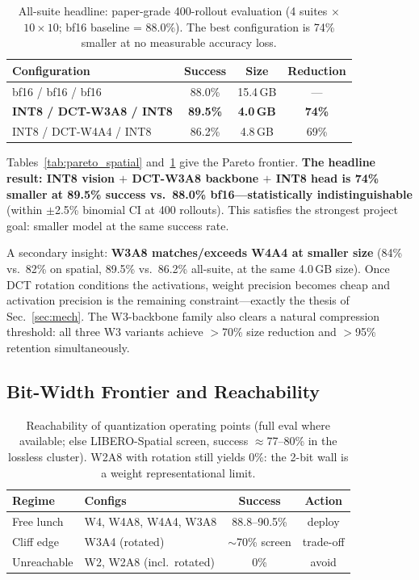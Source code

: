 \documentclass[conference]{IEEEtran}
\begin{document}
\begin{table}[h]\centering\small
\caption{All-suite headline: paper-grade 400-rollout evaluation (4 suites $\times$
$10\times10$; bf16 baseline = 88.0\%). The best configuration is 74\% smaller at no
measurable accuracy loss.}
\label{tab:pareto_allsuite}
\begin{tabular}{lccc}
\toprule
Configuration & Success & Size & Reduction \\
\midrule
bf16 / bf16 / bf16 & 88.0\% & 15.4\,GB & --- \\
\textbf{INT8 / DCT-W3A8 / INT8} & \textbf{89.5\%} & \textbf{4.0\,GB} & \textbf{74\%} \\
INT8 / DCT-W4A4 / INT8 & 86.2\% & 4.8\,GB & 69\% \\
\bottomrule
\end{tabular}
\end{table}

Tables~\ref{tab:pareto_spatial} and~\ref{tab:pareto_allsuite} give the Pareto frontier.
\textbf{The headline result: INT8 vision $+$ DCT-W3A8 backbone $+$ INT8 head is 74\% smaller
at 89.5\% success vs.\ 88.0\% bf16---statistically indistinguishable} (within $\pm$2.5\%
binomial CI at 400 rollouts). This satisfies the strongest project goal: smaller model at
the same success rate.

A secondary insight: \textbf{W3A8 matches/exceeds W4A4 at smaller size} (84\% vs.\ 82\% on
spatial, 89.5\% vs.\ 86.2\% all-suite, at the same 4.0\,GB size). Once DCT rotation
conditions the activations, weight precision becomes cheap and activation precision is the
remaining constraint---exactly the thesis of Sec.~\ref{sec:mech}. The W3-backbone family
also clears a natural compression threshold: all three W3 variants achieve
$>$70\% size reduction and $>$95\% retention simultaneously.

\subsection{Bit-Width Frontier and Reachability}
\label{sec:reach}

\begin{table}[h]\centering\small
\caption{Reachability of quantization operating points (full eval where available; else
LIBERO-Spatial screen, success $\approx$77--80\% in the lossless cluster). W2A8 with
rotation still yields 0\%: the 2-bit wall is a weight representational limit.}
\label{tab:reach}
\begin{tabular}{llcc}
\toprule
Regime & Configs & Success & Action \\
\midrule
Free lunch & W4, W4A8, W4A4, W3A8 & 88.8--90.5\% & deploy \\
Cliff edge & W3A4 (rotated) & $\sim$70\% screen & trade-off \\
Unreachable & W2, W2A8 (incl.\ rotated) & 0\% & avoid \\
\bottomrule
\end{tabular}
\end{table}
\end{document}
